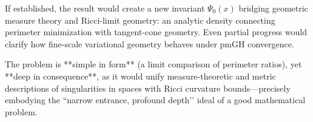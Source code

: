 If established, the result would create a new invariant \(\Psi_0(x)\) bridging geometric measure theory and Ricci-limit geometry: an analytic density connecting perimeter minimization with tangent-cone geometry. Even partial progress would clarify how fine-scale variational geometry behaves under pmGH convergence.  

The problem is **simple in form** (a limit comparison of perimeter ratios), yet **deep in consequence**, as it would unify measure-theoretic and metric descriptions of singularities in spaces with Ricci curvature bounds—precisely embodying the “narrow entrance, profound depth’’ ideal of a good mathematical problem.